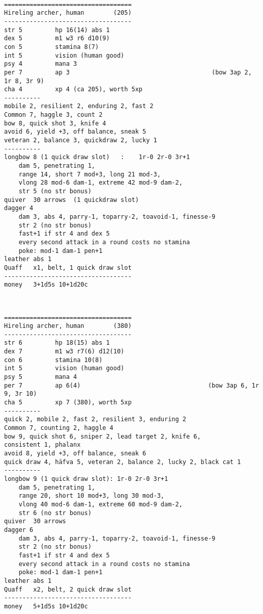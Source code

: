 \

\goodbreak \begin{samepage} \small \begin{verbatim}
===================================
Hireling archer, human        (205)
-----------------------------------
str	5         hp 16(14) abs 1
dex	5         m1 w3 r6 d10(9)
con	5         stamina 8(7)
int 5         vision (human good)
psy	4         mana 3
per	7         ap 3                                       (bow 3ap 2, 1r 8, 3r 9)
cha	4         xp 4 (ca 205), worth 5xp
----------
mobile 2, resilient 2, enduring 2, fast 2
Common 7, haggle 3, count 2
bow	8, quick shot 3, knife 4
avoid 6, yield +3, off balance, sneak 5
veteran 2, balance 3, quickdraw 2, lucky 1
----------
longbow	8 (1 quick draw slot)   :    1r-0 2r-0 3r+1
    dam 5, penetrating 1,
    range 14, short 7 mod+3, long 21 mod-3,
    vlong 28 mod-6 dam-1, extreme 42 mod-9 dam-2,
    str 5 (no str bonus)
quiver	30 arrows  (1 quickdraw slot)
dagger 4
    dam 3, abs 4, parry-1, toparry-2, toavoid-1, finesse-9
    str 2 (no str bonus)
    fast+1 if str 4 and dex 5
    every second attack in a round costs no stamina
    poke: mod-1 dam-1 pen+1
leather abs 1
Quaff	x1, belt, 1 quick draw slot
-----------------------------------
money	3+1d5s 10+1d20c
\end{verbatim} \normalsize \end{samepage}

\

\goodbreak \begin{samepage} \small \begin{verbatim}
===================================
Hireling archer, human        (380)
-----------------------------------
str	6         hp 18(15) abs 1
dex	7         m1 w3 r7(6) d12(10)
con	6         stamina 10(8)
int 5         vision (human good)
psy	5         mana 4
per	7         ap 6(4)                                   (bow 3ap 6, 1r 9, 3r 10)
cha	5         xp 7 (380), worth 5xp
----------
quick 2, mobile 2, fast 2, resilient 3, enduring 2
Common 7, counting 2, haggle 4
bow 9, quick shot 6, sniper	2, lead target 2, knife 6,
consistent 1, phalanx
avoid 8, yield +3, off balance, sneak 6
quick draw 4, häfva	5, veteran 2, balance 2, lucky 2, black cat 1
----------
longbow	9 (1 quick draw slot): 1r-0 2r-0 3r+1
    dam 5, penetrating 1,
    range 20, short 10 mod+3, long 30 mod-3,
    vlong 40 mod-6 dam-1, extreme 60 mod-9 dam-2,
    str 6 (no str bonus)
quiver	30 arrows
dagger 6
    dam 3, abs 4, parry-1, toparry-2, toavoid-1, finesse-9
    str 2 (no str bonus)
    fast+1 if str 4 and dex 5
    every second attack in a round costs no stamina
    poke: mod-1 dam-1 pen+1
leather abs 1
Quaff	x2, belt, 2 quick draw slot
-----------------------------------
money	5+1d5s 10+1d20c
\end{verbatim} \normalsize \end{samepage}

